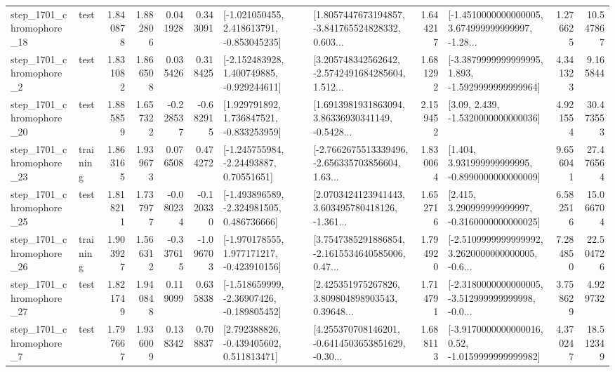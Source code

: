 \begin{tabular}{llrrrrllrlrr}
 step\_1701\_chromophore\_18 &      test &      1.840878 &    1.882806 &      0.041928 &  0.343091 &   [-1.021050455, 2.418613791, -0.853045235] &  [1.8057447673194857, -3.841765524828332, 0.603... &       1.644217 &  [-1.4510000000000005, 3.674999999999997, -1.28... &            1.276625 &         10.547867 \\
  step\_1701\_chromophore\_2 &      test &      1.831082 &    1.866508 &      0.035426 &  0.318425 &   [-2.152483928, 1.400749885, -0.929244611] &  [3.205748342562642, -2.5742491684285604, 1.512... &       1.681292 &  [-3.3879999999999995, 1.893, -1.5929999999999964] &            4.341323 &          9.165844 \\
 step\_1701\_chromophore\_20 &      test &      1.885859 &    1.657322 &     -0.228537 & -0.682915 &    [1.929791892, 1.736847521, -0.833253959] &  [1.6913981931863094, 3.86336930341149, -0.5428... &       2.159452 &                 [3.09, 2.439, -1.5320000000000036] &            4.921554 &         30.473553 \\
 step\_1701\_chromophore\_23 &  training &      1.863165 &    1.939673 &      0.076508 &  0.474272 &     [-1.245755984, -2.24493887, 0.70551651] &  [-2.7662675513339496, -2.656335703856604, 1.63... &       1.830064 &    [1.404, 3.931999999999995, -0.8990000000000009] &            9.656041 &         27.476564 \\
 step\_1701\_chromophore\_25 &      test &      1.818211 &    1.737977 &     -0.080234 & -0.120330 &   [-1.493896589, -2.324981505, 0.486736666] &  [2.0703424123941443, 3.603495780418126, -1.361... &       1.652716 &    [2.415, 3.290999999999997, -0.3160000000000025] &            6.582516 &         15.066704 \\
 step\_1701\_chromophore\_26 &  training &      1.903927 &    1.566312 &     -0.337615 & -1.096703 &   [-1.970178555, 1.977171217, -0.423910156] &  [3.7547385291886854, -2.1615534640585006, 0.47... &       1.794920 &  [-2.5109999999999992, 3.2620000000000005, -0.6... &            7.284850 &         22.504726 \\
 step\_1701\_chromophore\_27 &      test &      1.821749 &    1.940848 &      0.119099 &  0.635838 &   [-1.518659999, -2.36907426, -0.189805452] &  [2.425351975267826, 3.809804898903543, 0.39648... &       1.714791 &  [-2.3180000000000005, -3.512999999999998, -0.0... &            3.758629 &          4.929732 \\
  step\_1701\_chromophore\_7 &      test &      1.797667 &    1.936009 &      0.138342 &  0.708837 &    [2.792388826, -0.439405602, 0.511813471] &  [4.255370708146201, -0.6414503653851629, -0.30... &       1.688113 &   [-3.9170000000000016, 0.52, -1.0159999999999982] &            4.370247 &         18.512349 \\

\end{tabular}
